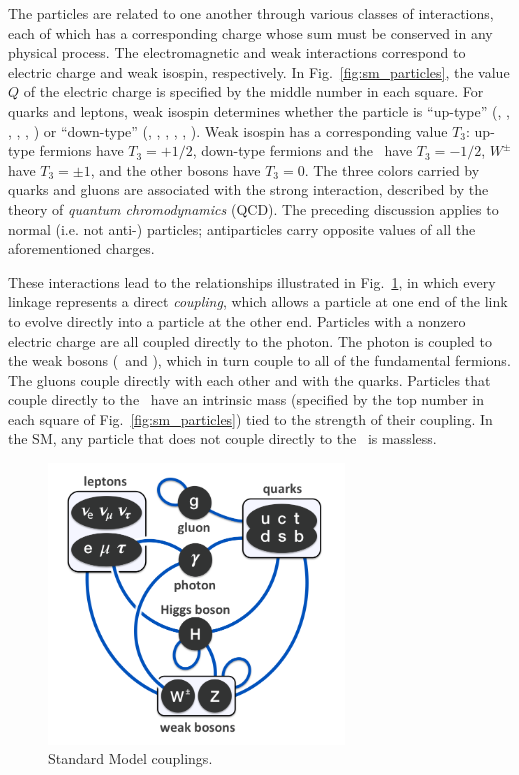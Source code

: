 \documentclass[oneside, letterpaper, 12pt, oldfontcommands]{memoir}
\begin{document}
The particles are related to one another through various
classes of interactions, each of which has a corresponding charge whose sum must be conserved in any physical process.
The electromagnetic and weak interactions correspond to electric charge and weak isospin, respectively.
In Fig.~\ref{fig:sm_particles}, the value $Q$ of the electric charge is specified by the middle number in each square.
For quarks and leptons, weak isospin determines whether the particle is ``up-type''
(\Pu, \Pd, \Pt, \Pne, \Pnmu, \Pntau) or ``down-type'' (\Pd, \Ps, \Pb, \Pe, \Pmu, \Ptau).
Weak isospin has a corresponding value $T_{3}$: up-type fermions have $T_{3} = \mathrm{+}1/2$, down-type fermions and the \PH\ have
$T_{3} = \mathrm{-}1/2$, $W^\pm$ have $T_{3} = \pm1$, and the other bosons have $T_{3} = 0$.
The three colors carried by quarks and gluons are associated with the strong interaction, described by the theory of \textit{quantum
chromodynamics} (QCD). The preceding discussion applies to normal (i.e. not anti-) particles; antiparticles carry opposite values of all the
aforementioned charges.

These interactions lead to the relationships illustrated in Fig.~\ref{fig:sm_interactions}, in which every linkage represents
a direct \textit{coupling}, which allows a particle at one end of the link to evolve directly into a particle at the other end.
Particles with a nonzero electric charge are all coupled directly to the photon. The photon is coupled to the weak bosons
(\PZ\ and \PW), which in turn couple to all of the fundamental fermions.
The gluons couple directly with each other and with the quarks.
Particles that couple directly to the \PH\ have an intrinsic mass (specified by the top number in each square of Fig.~\ref{fig:sm_particles})
tied to the strength of their coupling. In the SM, any particle that does not couple directly to the \PH\ is massless.

\begin{figure}[hbtp]
  \begin{center}
    \includegraphics[width=0.7\textwidth]{Figures/Elementary_particle_interactions_in_the_Standard_Model.png}
    \caption{
      Standard Model couplings.
    }
    \label{fig:sm_interactions}
  \end{center}
\end{figure}
\end{document}

